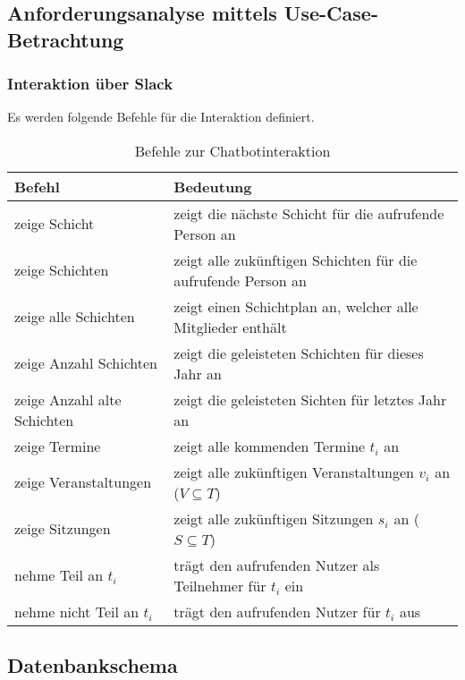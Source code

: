 \subsection{Anforderungsanalyse mittels Use-Case-Betrachtung}

\subsubsection{Interaktion über Slack}

Es werden folgende Befehle für die Interaktion definiert.

\begin{table}[H]
\centering
\begin{tabular}{l|l}
  Befehl & Bedeutung \\
 \hline
 zeige Schicht & zeigt die nächste Schicht für die aufrufende Person an \\
 zeige Schichten & zeigt alle zukünftigen Schichten für die aufrufende Person an \\
 zeige alle Schichten & zeigt einen Schichtplan an, welcher alle Mitglieder enthält \\
 
 zeige Anzahl Schichten & zeigt die geleisteten Schichten für dieses Jahr an \\
 zeige Anzahl alte Schichten & zeigt die geleisteten Sichten für letztes Jahr an \\
 
 zeige Termine & zeigt alle kommenden Termine $t_i$ an \\
 zeige Veranstaltungen & zeigt alle zukünftigen Veranstaltungen $v_i$ an ($V \subseteq T$) \\
 zeige Sitzungen & zeigt alle zukünftigen Sitzungen $s_i$ an ($S \subseteq T$) \\
 
 nehme Teil an $t_i$ & trägt den aufrufenden Nutzer als Teilnehmer für $t_i$ ein \\
 nehme nicht Teil an $t_i$ & trägt den aufrufenden Nutzer für $t_i$ aus
 
\end{tabular}
\caption{Befehle zur Chatbotinteraktion}
\label{tab:chatbotinteraktion}
\end{table}


\subsection{Datenbankschema}

